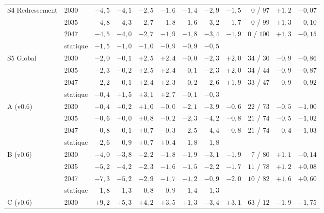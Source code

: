 \begin{longtable}{llrrrrrrrrrr}
\addlinespace
S4 Redressement & 2030 & $-4{,}5$ & $-4{,}1$ & $-2{,}5$ & $-1{,}6$ & $-1{,}4$ & $-2{,}9$ & $-1{,}5$ & $0$ / $97$ & $+1{,}2$ & $-0{,}07$\\
 & 2035 & $-4{,}8$ & $-4{,}3$ & $-2{,}7$ & $-1{,}8$ & $-1{,}6$ & $-3{,}2$ & $-1{,}7$ & $0$ / $99$ & $+1{,}3$ & $-0{,}10$\\
 & 2047 & $-4{,}5$ & $-4{,}0$ & $-2{,}7$ & $-1{,}9$ & $-1{,}8$ & $-3{,}4$ & $-1{,}9$ & $0$ / $100$ & $+1{,}3$ & $-0{,}15$\\
 & statique & $-1{,}5$ & $-1{,}0$ & $-1{,}0$ & $-0{,}9$ & $-0{,}9$ & $-0{,}5$ & & & & \\
\addlinespace
S5 Global & 2030 & $-2{,}0$ & $-0{,}1$ & $+2{,}5$ & $+2{,}4$ & $-0{,}0$ & $-2{,}3$ & $+2{,}0$ & $34$ / $30$ & $-0{,}9$ & $-0{,}86$\\
 & 2035 & $-2{,}3$ & $-0{,}2$ & $+2{,}5$ & $+2{,}4$ & $-0{,}1$ & $-2{,}3$ & $+2{,}0$ & $34$ / $44$ & $-0{,}9$ & $-0{,}87$\\
 & 2047 & $-2{,}2$ & $-0{,}1$ & $+2{,}4$ & $+2{,}3$ & $-0{,}2$ & $-2{,}6$ & $+1{,}9$ & $33$ / $47$ & $-0{,}9$ & $-0{,}92$\\
 & statique & $-0{,}4$ & $+1{,}5$ & $+3{,}1$ & $+2{,}7$ & $-0{,}1$ & $-0{,}3$ & & & & \\
\addlinespace
A (v0.6) & 2030 & $-0{,}4$ & $+0{,}2$ & $+1{,}0$ & $-0{,}0$ & $-2{,}1$ & $-3{,}9$ & $-0{,}6$ & $22$ / $73$ & $-0{,}5$ & $-1{,}00$\\
 & 2035 & $-0{,}6$ & $+0{,}0$ & $+0{,}8$ & $-0{,}2$ & $-2{,}3$ & $-4{,}2$ & $-0{,}8$ & $21$ / $74$ & $-0{,}5$ & $-1{,}02$\\
 & 2047 & $-0{,}8$ & $-0{,}1$ & $+0{,}7$ & $-0{,}3$ & $-2{,}5$ & $-4{,}4$ & $-0{,}8$ & $21$ / $74$ & $-0{,}4$ & $-1{,}03$\\
 & statique & $-2{,}6$ & $-0{,}9$ & $+0{,}7$ & $+0{,}4$ & $-1{,}8$ & $-1{,}8$ & & & & \\
\addlinespace
B (v0.6) & 2030 & $-4{,}0$ & $-3{,}8$ & $-2{,}2$ & $-1{,}8$ & $-1{,}9$ & $-3{,}1$ & $-1{,}9$ & $7$ / $80$ & $+1{,}1$ & $-0{,}14$\\
 & 2035 & $-5{,}2$ & $-4{,}2$ & $-2{,}3$ & $-1{,}6$ & $-1{,}5$ & $-2{,}2$ & $-1{,}7$ & $11$ / $78$ & $+1{,}2$ & $+0{,}08$\\
 & 2047 & $-7{,}3$ & $-5{,}2$ & $-2{,}9$ & $-1{,}7$ & $-1{,}2$ & $-0{,}9$ & $-2{,}0$ & $10$ / $82$ & $+1{,}6$ & $+0{,}60$\\
 & statique & $-1{,}8$ & $-1{,}3$ & $-0{,}8$ & $-0{,}9$ & $-1{,}4$ & $-1{,}3$ & & & & \\
\addlinespace
C (v0.6) & 2030 & $+9{,}2$ & $+5{,}3$ & $+4{,}2$ & $+3{,}5$ & $+1{,}3$ & $-3{,}4$ & $+3{,}1$ & $63$ / $12$ & $-1{,}9$ & $-1{,}75$\\

\end{longtable}

